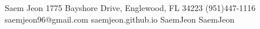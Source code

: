 \header
  {Saem Jeon}
  {1775 Bayshore Drive, Englewood, FL 34223}
  {(951)447-1116}
  {saemjeon96@gmail.com}
  {saemjeon.github.io}
  {SaemJeon}
  {SaemJeon}